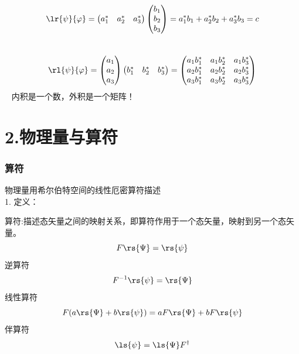 \begin{frame}{}
        \解 ~ \[\lr{\psi}{\varphi} = \begin{pmatrix}
            a_1 ^* &
            a_2 ^* &
            a_3 ^*
        \end{pmatrix}
            \begin{pmatrix}
            b_1\\
            b_2\\
            b_3
        \end{pmatrix}
        =a_1 ^* b_1 +a_2 ^* b_2 +a_3 ^* b_3
        =c 
        \]
        ~ \[\rl{\psi}{\varphi} = \begin{pmatrix}
            a_1  \\
            a_2  \\
            a_3 
        \end{pmatrix}
            \begin{pmatrix}
            b_1 ^* &
            b_2 ^* &
            b_3 ^*
        \end{pmatrix}
        =  \begin{pmatrix}
            a_1b_1 ^* & a_1b_2 ^* & a_1b_3 ^* \\
            a_2b_1 ^* & a_2b_2 ^* & a_2b_3 ^* \\
            a_3b_1 ^* & a_3b_2 ^* & a_3b_3 ^* 
        \end{pmatrix}
        \]
    \Tips ~ 内积是一个数，外积是一个矩阵！
\end{frame}

\section{2.物理量与算符}

\begin{frame}
    \frametitle{算符}
    物理量用希尔伯特空间的线性厄密算符描述\\
    1. 定义：
    \begin{itemize}
        \Item 算符:描述态矢量之间的映射关系，即算符作用于一个态矢量，映射到另一个态矢量。
        \[F \rs{\Psi}=\rs{\psi}\]
        \Item 逆算符  
        \[F^{-1}\rs{\psi}=\rs{\Psi} \] 
        \Item 线性算符 \[F (a\rs{\Psi} +b\rs{\psi}) = aF \rs{\Psi} +bF\rs{\psi}\]
        \Item 伴算符   \[\ls{\psi}=\ls{\Psi}F^{\dagger} \]
    \end{itemize}
\end{frame} 


